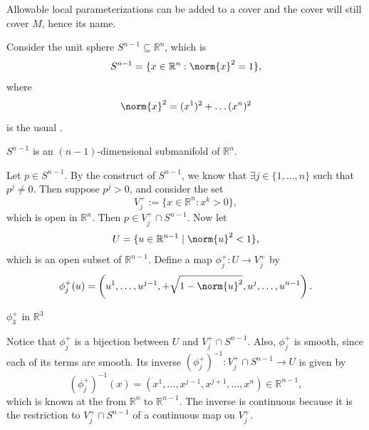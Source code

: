 \documentclass[notoc,notitlepage]{tufte-book}
\begin{document}
\begin{note}
  Allowable local parameterizations can be added to a cover and the cover will
  still cover $M$, hence its name.
\end{note}

\begin{eg}\label{eg:parameterization_of_s_n_1_in_r_n_no1}
  Consider the unit sphere $S^{n - 1} \subseteq \mathbb{R}^n$, which is
  \begin{equation*}
    S^{n - 1} = \{ x \in \mathbb{R}^n : \norm{x}^2 = 1 \},
  \end{equation*}
  where
  \begin{equation*}
    \norm{x}^2 = (x^1)^2 + \hdots (x^n)^2
  \end{equation*}
  is the usual  .

   $S^{n - 1}$ is an $(n - 1)$-dimensional submanifold of
  $\mathbb{R}^n$.

  Let $p \in S^{n - 1}$. By the construct of $S^{n - 1}$, we know that $\exists j
  \in \{ 1, \ldots, n \}$ such that $p^j \neq 0$. Then suppose $p^j > 0$, and
  consider the set
  \begin{equation*}
    V_j^+ := \{ x \in \mathbb{R}^n : x^k > 0 \},
  \end{equation*}
  which is open in $\mathbb{R}^n$. Then $p \in V_j^+ \cap S^{n - 1}$. Now let
  \begin{equation*}
    U = \{ u \in \mathbb{R}^{n - 1} \mid \norm{u}^2 < 1 \},
  \end{equation*}
  which is an open subset of $\mathbb{R}^{n - 1}$. Define a map $\phi_j^+ : U
  \to V_j^+$ by
  \begin{equation*}
    \phi_j^+(u) = \left( u^1, \ldots, u^{j - 1}, + \sqrt{1 - \norm{u}^2}, u^j,
    \ldots, u^{n - 1} \right).
  \end{equation*}
  \begin{marginfigure}
    \centering
    \caption{$\phi_3^+$ in $\mathbb{R}^3$}\label{fig:_phi_3_in_r_3_}
  \end{marginfigure}
  Notice that $\phi_j^+$ is a bijection between $U$ and $V_j^+ \cap S^{n - 1}$.
  Also, $\phi_j^+$ is smooth, since each of its terms are smooth. Its inverse
  $(\phi_j^+)^{-1} : V_j^+ \cap S^{n - 1} \to U$ is given by
  \begin{equation*}
    ( \phi_j^+)^{-1}(x) = (x^1, \ldots, x^{j - 1}, x^{j + 1}, \ldots, x^n) \in
    \mathbb{R}^{n - 1},
  \end{equation*}
  which is known at the  from $\mathbb{R}^n$ to
  $\mathbb{R}^{n - 1}$. The inverse is continuous because it is the restriction
  to $V_j^+ \cap S^{n - 1}$ of a continuous map on $V_j^+$.


\end{eg}
\end{document}
